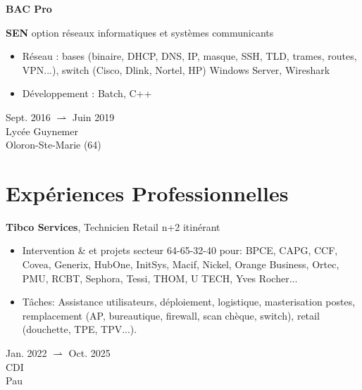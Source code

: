 \documentclass[11pt, a4paper]{article}
\newenvironment{highlights}{
    \begin{itemize}[
        topsep=0.10 cm,
        parsep=0.10 cm,
        partopsep=0pt,
        itemsep=0pt,
        leftmargin=0.4 cm + 10pt
    ]
}{
    \end{itemize}
} %
\newenvironment{twocolentry}[2][]{
    \onecolentry
    \def\secondColumn{#2}
    \setcolumnwidth{\fill, 4.5 cm}
    \begin{paracol}{2}
}{
    \switchcolumn \raggedleft \secondColumn
    \end{paracol}
    \endonecolentry
} %
\newenvironment{threecolentry}[3][]{
    \onecolentry
    \def\thirdColumn{#3}
    \setcolumnwidth{1 cm, \fill, 4.5 cm}
    \begin{paracol}{3}
    {\raggedright #2} \switchcolumn
}{
    \switchcolumn \raggedleft \thirdColumn
    \end{paracol}
    \endonecolentry
} %
\let\hrefWithoutArrow\href
\renewcommand{\href}[2]{\hrefWithoutArrow{#1}{\ifthenelse{\equal{#2}{}}{ }{#2 }\raisebox{.15ex}{\footnotesize \faExternalLink*}}}
\begin{document}
        \vspace{0.2 cm}


        \begin{threecolentry}{\textbf{BAC Pro}}{
            Sept. 2016 $ \rightharpoonup $ Juin 2019 \\
            Lycée Guynemer \\
            Oloron-Ste-Marie (64)
        }
            \textbf{SEN} option réseaux informatiques et systèmes communicants
            \begin{highlights}
                \item Réseau : bases (binaire, DHCP, DNS, IP, masque, SSH, TLD, trames, routes, VPN...), switch (Cisco, Dlink, Nortel, HP) Windows Server, Wireshark
                \item  Développement : Batch, C++
            \end{highlights}
        \end{threecolentry}

    
    \section{Expériences Professionnelles}

        
        \begin{twocolentry}{
            Jan. 2022 $ \rightharpoonup $ Oct. 2025 \\
            CDI \\
            Pau
        }
            \textbf{Tibco Services}, Technicien Retail n+2 itinérant 
            \begin{highlights}
                \item Intervention \href{https://w.wiki/D3ur}{IMAC} \& \href{https://w.wiki/D3uh}{MCO} et projets secteur 64-65-32-40 pour: BPCE, CAPG, CCF, Covea, Generix, HubOne, InitSys, Macif, Nickel, Orange Business, Ortec, PMU, RCBT, Sephora, Tessi, THOM, U TECH, Yves Rocher...
                \item Tâches: Assistance utilisateurs, déploiement, logistique, masterisation postes, remplacement (AP, bureautique, firewall, scan chèque, switch), retail (douchette, TPE, TPV...).
            \end{highlights}
        \end{twocolentry}
\end{document}
